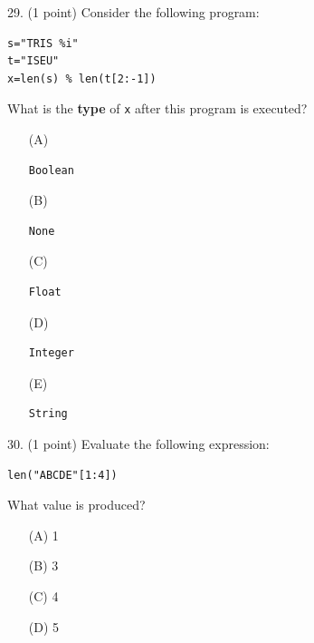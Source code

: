 \documentclass{article}
\begin{document}
\noindent
\begin{minipage}{\textwidth}
29. (1 point)
Consider the following program:
\begin{verbatim}
s="TRIS %i"
t="ISEU"
x=len(s) % len(t[2:-1])
\end{verbatim}
What is the \textbf{type} of \texttt{x} after this program is executed?

\begin{enumerate}
\item[(A)]
\begin{verbatim}Boolean\end{verbatim}

\item[(B)]
\begin{verbatim}None\end{verbatim}

\item[(C)]
\begin{verbatim}Float\end{verbatim}

\item[(D)]
\begin{verbatim}Integer\end{verbatim}

\item[(E)]
\begin{verbatim}String\end{verbatim}

\end{enumerate}
\end{minipage}
\vspace{2em}
\filbreak\vfil{}\vfilneg

\noindent
\begin{minipage}{\textwidth}
30. (1 point)
Evaluate the following expression:
\begin{verbatim}
len("ABCDE"[1:4])
\end{verbatim}
What value is produced?

\begin{enumerate}
\item[(A)]
1

\item[(B)]
3

\item[(C)]
4

\item[(D)]
5

\end{enumerate}
\end{minipage}
\end{document}
